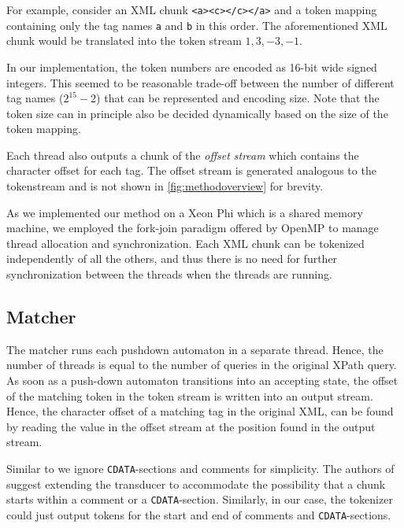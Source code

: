 For example, consider an XML chunk \verb;<a><c></c></a>; and a token mapping
containing only the tag names \verb;a; and \verb;b; in this order. The
aforementioned XML chunk would be translated into the token stream $1, 3, -3,
-1$.

In our implementation, the token numbers are encoded as 16-bit wide signed
integers. This seemed to be reasonable trade-off between the number of different
tag names ($2^{15}-2$) that can be represented and encoding size. Note that the
token size can in principle also be decided dynamically based on the size of the
token mapping.

Each thread also outputs a chunk of the \emph{offset stream} which contains the
character offset for each tag. The offset stream is generated analogous to the
tokenstream and is not shown in \ref{fig:methodoverview} for brevity.

As we implemented our method on a Xeon Phi which is a shared
memory machine, we employed the fork-join paradigm offered by OpenMP to manage
thread allocation and synchronization. Each XML chunk can be tokenized
independently of all the others, and thus there is no need for further
synchronization between the threads when the threads are running.

\subsection{Matcher}
The matcher runs each pushdown automaton in a separate thread. Hence, the
number of threads is equal to the number of queries in the original XPath
query. As soon as a push-down automaton transitions into an accepting state,
the offset of the matching token in the token stream is written into an output
stream. Hence, the character offset of a matching tag in the original XML, can
be found by reading the value in the offset stream at the position found in the
output stream.

Similar to \cite{Ogden2013} we ignore \texttt{CDATA}-sections and comments for
simplicity. The authors of \cite{Ogden2013} suggest extending the transducer to
accommodate the possibility that a chunk starts within a comment or a
\texttt{CDATA}-section. Similarly, in our case, the tokenizer could just output
tokens for the start and end of comments and \texttt{CDATA}-sections.



